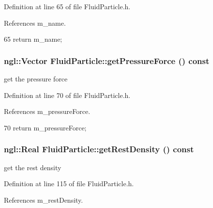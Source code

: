 Definition at line 65 of file FluidParticle.h.



References m\_\-name.




\begin{DoxyCode}
65 { return m_name; }
\end{DoxyCode}


\hypertarget{class_fluid_particle_af1320742baea9749e69f29b6ab8c3ccd}{
\subsubsection[{getPressureForce}]{\setlength{\rightskip}{0pt plus 5cm}ngl::Vector FluidParticle::getPressureForce () const}}
\label{class_fluid_particle_af1320742baea9749e69f29b6ab8c3ccd}


get the pressure force 



Definition at line 70 of file FluidParticle.h.



References m\_\-pressureForce.




\begin{DoxyCode}
70 { return m_pressureForce; }
\end{DoxyCode}


\hypertarget{class_fluid_particle_a80daf1a3c8c36559e4f28a5240ecca50}{
\subsubsection[{getRestDensity}]{\setlength{\rightskip}{0pt plus 5cm}ngl::Real FluidParticle::getRestDensity () const}}
\label{class_fluid_particle_a80daf1a3c8c36559e4f28a5240ecca50}


get the rest density 



Definition at line 115 of file FluidParticle.h.



References m\_\-restDensity.




